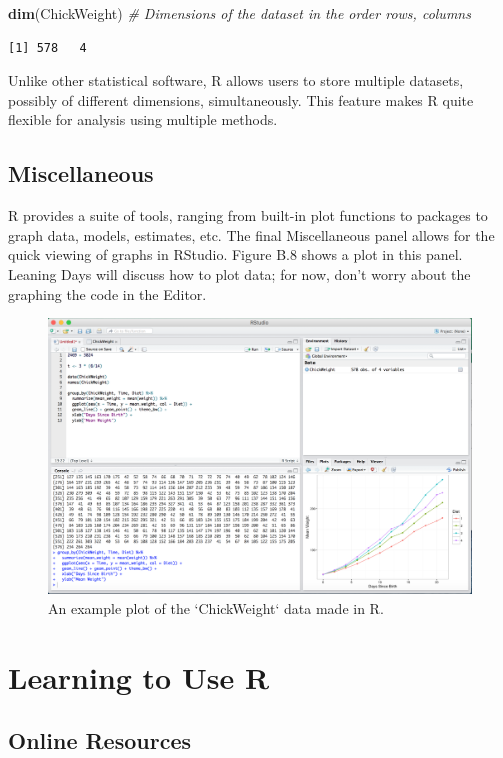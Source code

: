 \documentclass[12pt,]{book}
\newenvironment{Shaded}{\begin{snugshade}}{\end{snugshade}}
\newcommand{\CommentTok}[1]{\textcolor[rgb]{0.56,0.35,0.01}{\textit{#1}}}
\newcommand{\KeywordTok}[1]{\textcolor[rgb]{0.13,0.29,0.53}{\textbf{#1}}}
\newcommand{\NormalTok}[1]{#1}
\begin{document}
\begin{Shaded}
\begin{Highlighting}[]
\KeywordTok{dim}\NormalTok{(ChickWeight) }\CommentTok{# Dimensions of the dataset in the order rows, columns}
\end{Highlighting}
\end{Shaded}

\begin{verbatim}
[1] 578   4
\end{verbatim}

Unlike other statistical software, R allows users to store multiple datasets, possibly of different dimensions, simultaneously. This feature makes R quite flexible for analysis using multiple methods.

\hypertarget{miscellaneous}{%
\subsection{Miscellaneous}\label{miscellaneous}}

R provides a suite of tools, ranging from built-in plot functions to packages to graph data, models, estimates, etc. The final Miscellaneous panel allows for the quick viewing of graphs in RStudio. Figure B.8 shows a plot in this panel. Leaning Days will discuss how to plot data; for now, don't worry about the graphing the code in the Editor.

\begin{figure}
\includegraphics[width=0.6\linewidth]{Images/graph} \caption{An example plot of the `ChickWeight` data made in R.}\label{fig:graph}
\end{figure}

\hypertarget{learning-to-use-r}{%
\section{Learning to Use R}\label{learning-to-use-r}}

\hypertarget{online-resources}{%
\subsection{Online Resources}\label{online-resources}}
\end{document}
